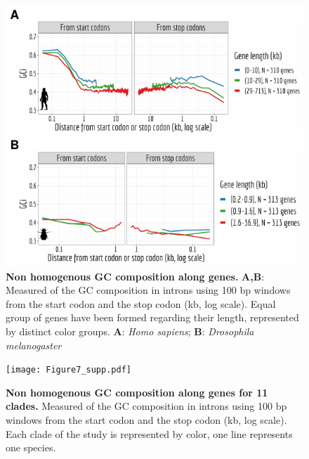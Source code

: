 \begin{figure}[t]   
    \begin{center}                                                                       
        \includegraphics[width=\textwidth]{Figure6_supp.pdf}
    \end{center}                                                                       
    \caption[Non homogenous GC composition along genes]{\textbf{Non homogenous GC composition along genes.} \textbf{A,B}: Measured of the GC composition in introns using 100 bp windows from the start codon and the stop codon (kb, log scale). Equal group of genes have been formed regarding their length, represented by distinct color groups. \textbf{A}: \textit{Homo sapiens}; \textbf{B}: \textit{Drosophila melanogaster}} 
    \label{suppfig:CU6}
\end{figure}


\begin{figure}[t]
    \centering                                                                            
    \texttt{[image: Figure7\_supp.pdf]}
    \caption[Non homogenous GC composition along genes for 11 clades]{\textbf{Non homogenous GC composition along genes for 11 clades.} Measured of the GC composition in introns using 100 bp windows from the start codon and the stop codon (kb, log scale). Each clade of the study is represented by color, one line represents one species.} 
    \label{suppfig:CU7}
\end{figure}


